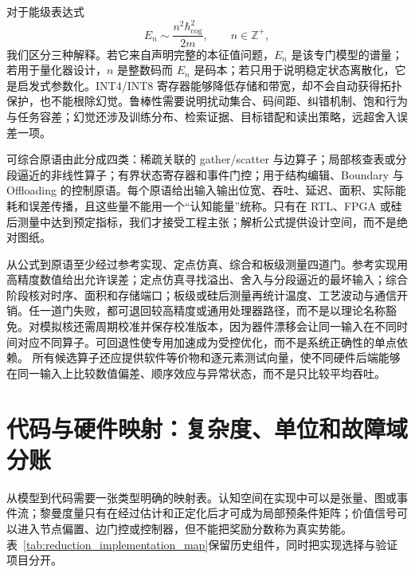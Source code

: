 对于能级表达式
\begin{equation}
E_n\sim\frac{n^2\hbar_{\mathrm{cog}}^2}{2m},\qquad n\in\mathbb Z^+,
\end{equation}
我们区分三种解释。若它来自声明完整的本征值问题，$E_n$ 是该专门模型的谱量；若用于量化器设计，$n$ 是整数码而 $E_n$ 是码本；若只用于说明稳定状态离散化，它是启发式参数化。INT4/INT8 寄存器能够降低存储和带宽，却不会自动获得拓扑保护，也不能根除幻觉。鲁棒性需要说明扰动集合、码间距、纠错机制、饱和行为与任务容差；幻觉还涉及训练分布、检索证据、目标错配和读出策略，远超舍入误差一项。

可综合原语由此分成四类：稀疏关联的 gather/scatter 与边算子；局部核查表或分段逼近的非线性算子；有界状态寄存器和事件门控；用于结构编辑、Boundary 与 Offloading 的控制原语。每个原语给出输入输出位宽、吞吐、延迟、面积、实际能耗和误差传播，且这些量不能用一个“认知能量”统称。只有在 RTL、FPGA 或硅后测量中达到预定指标，我们才接受工程主张；解析公式提供设计空间，而不是绝对图纸。

从公式到原语至少经过参考实现、定点仿真、综合和板级测量四道门。参考实现用高精度数值给出允许误差；定点仿真寻找溢出、舍入与分段逼近的最坏输入；综合阶段核对时序、面积和存储端口；板级或硅后测量再统计温度、工艺波动与通信开销。任一道门失败，都可退回较高精度或通用处理器路径，而不是以理论名称豁免。对模拟核还需周期校准并保存校准版本，因为器件漂移会让同一输入在不同时间对应不同算子。可回退性使专用加速成为受控优化，而不是系统正确性的单点依赖。
所有候选算子还应提供软件等价物和逐元素测试向量，使不同硬件后端能够在同一输入上比较数值偏差、顺序效应与异常状态，而不是只比较平均吞吐。

\section{代码与硬件映射：复杂度、单位和故障域分账}

从模型到代码需要一张类型明确的映射表。认知空间在实现中可以是张量、图或事件流；黎曼度量只有在经过估计和正定化后才可成为局部预条件矩阵；价值信号可以进入节点偏置、边门控或控制器，但不能把奖励分数称为真实势能。表~\ref{tab:reduction_implementation_map}保留历史组件，同时把实现选择与验证项目分开。

